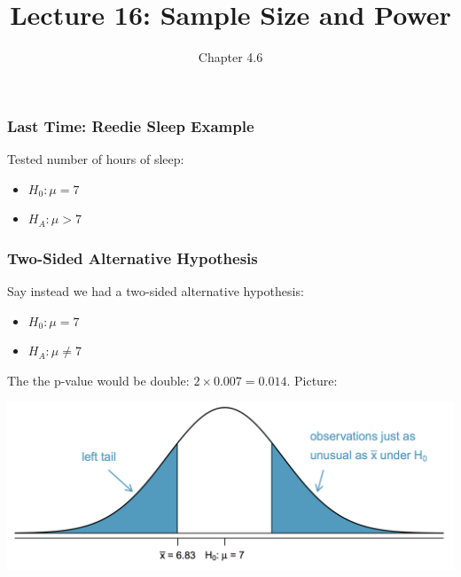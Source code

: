 \documentclass[handout]{beamer}
\title{Lecture 16: Sample Size and Power}
\author{Chapter 4.6}
\date{}
\newcommand{\blue}[1]{\textcolor{blue2}{#1}}
\begin{document}
\begin{frame}
\titlepage
\end{frame}


\begin{frame}
\frametitle{Last Time:  Reedie Sleep Example}
Tested number of hours of sleep:
\begin{itemize}
\item $H_0: \mu = 7$
\item $H_A: \mu > 7$
\end{itemize}

\vspace{3cm}

\end{frame}


\begin{frame}
\frametitle{Two-Sided Alternative Hypothesis}
Say instead we had a \blue{two-sided alternative hypothesis}:

\begin{itemize}
\item $H_0: \mu = 7$
\item $H_A: \mu \neq 7$
\end{itemize}

\pause The the p-value would be double: $2 \times 0.007= 0.014$.  Picture:

\begin{center}
\includegraphics[width=\textwidth]{figure/two-sided.png}
\end{center}

\end{frame}
\end{document}
